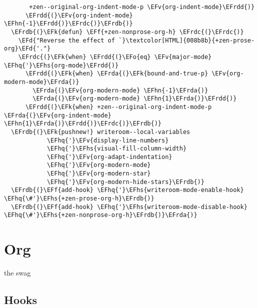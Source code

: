 \documentclass{article}
\newcommand{\EFd}[1]{\textcolor{EFd}{#1}} %
\newcommand{\EFk}[1]{\textcolor{EFk}{#1}} %
\newcommand{\EFf}[1]{\textcolor{EFf}{#1}} %
\newcommand{\EFv}[1]{\textcolor{EFv}{#1}} %
\newcommand{\EFo}[1]{\textcolor{EFo}{#1}} %
\newcommand{\EFhn}[1]{\textcolor{EFhn}{\textbf{#1}}} %
\newcommand{\EFhq}[1]{#1} %
\newcommand{\EFhs}[1]{\textcolor{EFhs}{#1}} %
\newcommand{\EFrda}[1]{\textcolor{EFrda}{#1}} %
\newcommand{\EFrdb}[1]{\textcolor{EFrdb}{#1}} %
\newcommand{\EFrdc}[1]{\textcolor{EFrdc}{#1}} %
\newcommand{\EFrdd}[1]{\textcolor{EFrdd}{#1}} %
\begin{document}
\begin{Code}
\begin{Verbatim}
       +zen--original-org-indent-mode-p \EFv{org-indent-mode}\EFrdd{)}
      \EFrdd{(}\EFv{org-indent-mode} \EFhn{-1}\EFrdd{)}\EFrdc{)}\EFrdb{)}
  \EFrdb{(}\EFk{defun} \EFf{+zen-nonprose-org-h} \EFrdc{(}\EFrdc{)}
    \EFd{"Reverse the effect of `}\textcolor[HTML]{008b8b}{+zen-prose-org}\EFd{'."}
    \EFrdc{(}\EFk{when} \EFrdd{(}\EFo{eq} \EFv{major-mode} \EFhq{'}\EFhs{org-mode}\EFrdd{)}
      \EFrdd{(}\EFk{when} \EFrda{(}\EFk{bound-and-true-p} \EFv{org-modern-mode}\EFrda{)}
        \EFrda{(}\EFv{org-modern-mode} \EFhn{-1}\EFrda{)}
        \EFrda{(}\EFv{org-modern-mode} \EFhn{1}\EFrda{)}\EFrdd{)}
      \EFrdd{(}\EFk{when} +zen--original-org-indent-mode-p \EFrda{(}\EFv{org-indent-mode} \EFhn{1}\EFrda{)}\EFrdd{)}\EFrdc{)}\EFrdb{)}
  \EFrdb{(}\EFk{pushnew!} writeroom--local-variables
            \EFhq{'}\EFv{display-line-numbers}
            \EFhq{'}\EFhs{visual-fill-column-width}
            \EFhq{'}\EFv{org-adapt-indentation}
            \EFhq{'}\EFv{org-modern-mode}
            \EFhq{'}\EFv{org-modern-star}
            \EFhq{'}\EFv{org-modern-hide-stars}\EFrdb{)}
  \EFrdb{(}\EFf{add-hook} \EFhq{'}\EFhs{writeroom-mode-enable-hook} \EFhq{\#'}\EFhs{+zen-prose-org-h}\EFrdb{)}
  \EFrdb{(}\EFf{add-hook} \EFhq{'}\EFhs{writeroom-mode-disable-hook} \EFhq{\#'}\EFhs{+zen-nonprose-org-h}\EFrdb{)}\EFrda{)}
\end{Verbatim}
\end{Code}

\section{Org}
\label{sec:org262bf0d}
the swag

\subsection{Hooks}
\label{sec:org8d7508f}
\end{document}
